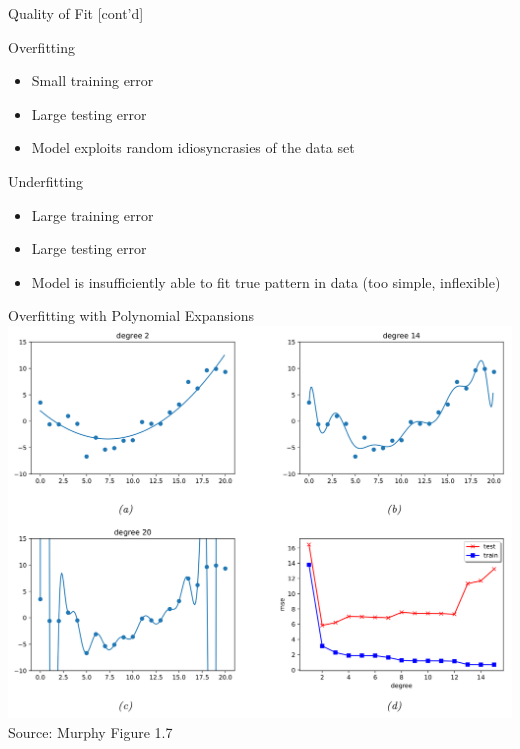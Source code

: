 \documentclass[ignorenonframetext,xcolor=x11names]{beamer}
\begin{document}
\begin{frame}{Quality of Fit \small [cont'd]}
\begin{block}{Overfitting}
  \begin{itemize}
     \item Small training error
     \item Large testing error
     \item Model exploits random idiosyncrasies of the data set
  \end{itemize}
\end{block}

\begin{block}{Underfitting}
  \begin{itemize}
     \item Large training error
     \item Large testing error
     \item Model is insufficiently able to fit true pattern in data (too simple, inflexible)
  \end{itemize}
\end{block}
\end{frame}

\begin{frame}{Overfitting with Polynomial Expansions}
\centering
\includegraphics[width=.9\textwidth]{screen2.png} \\

\scriptsize Source: Murphy Figure 1.7
\end{frame}
\end{document}
